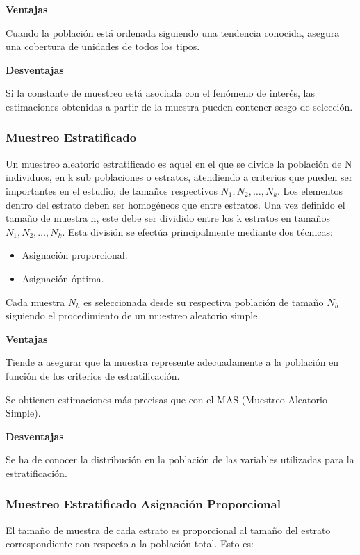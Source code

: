 \textbf{Ventajas}

Cuando la población está ordenada siguiendo una tendencia conocida, asegura una cobertura de unidades de todos los tipos.

\textbf{Desventajas}

Si la constante de muestreo está asociada con el fenómeno de interés, las estimaciones obtenidas a partir de la muestra pueden contener sesgo de selección.


\subsubsection{Muestreo Estratificado}

Un muestreo aleatorio estratificado es aquel en el que
se divide la población de N individuos, en k sub
poblaciones o estratos, atendiendo a criterios que
pueden ser importantes en el estudio, de tamaños
respectivos $N_1, N_2,\dots ,N_k$. Los elementos dentro del
estrato deben ser homogéneos que entre estratos.
Una vez definido el tamaño de muestra n, este debe
ser dividido entre los k estratos en tamaños
$N_1,N_2,\dots ,N_k$.
Esta división se efectúa principalmente mediante dos
técnicas:

\begin{itemize}
    \item Asignación proporcional.
    \item Asignación óptima.
\end{itemize}


Cada muestra $N_h$ es seleccionada desde su respectiva
población de tamaño $N_h$ siguiendo el procedimiento de
un muestreo aleatorio simple.

\textbf{Ventajas}

Tiende a asegurar que la muestra represente
adecuadamente a la población en función de
los criterios de estratificación.

Se obtienen estimaciones más precisas que
con el MAS (Muestreo Aleatorio Simple).

\textbf{Desventajas}

Se ha de conocer la distribución en la población
de las variables utilizadas para la estratificación.

\subsubsection{Muestreo Estratificado Asignación Proporcional}


El tamaño de muestra de cada estrato es
proporcional al tamaño del estrato
correspondiente con respecto a la población
total. Esto es:

